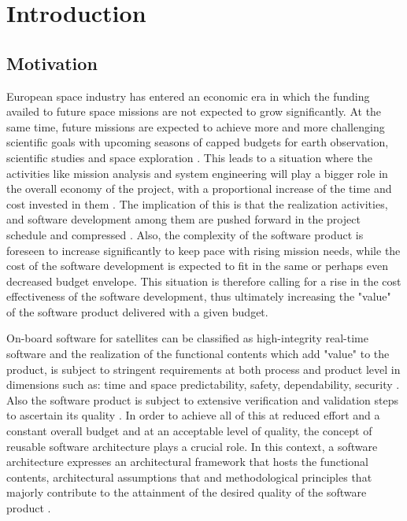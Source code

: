 
\chapter{Introduction}
\label{chap: Introduction}
\section{Motivation}
European space industry has entered an economic era in which the funding availed to future space missions are not expected to grow significantly. At the same time, future missions are expected to achieve more and more challenging scientific goals with upcoming seasons of capped budgets for earth observation, scientific studies and space exploration \cite{PhdThesis}. This leads to a situation where the activities like mission analysis and system engineering will play a bigger role in the overall economy of the project, with a proportional increase of the time and cost invested in them \cite{PhdThesis}. The implication of this is that the realization activities, and software development among them are pushed forward in the project schedule and compressed \cite{SAVOIR}. Also, the complexity of the software product is foreseen to increase significantly to keep pace with rising mission needs, while the cost of the software development is expected to fit in the same or perhaps even decreased budget envelope. This situation is therefore calling for a rise in the cost effectiveness of the software development, thus ultimately increasing the "value" of the software product delivered with a given budget.

On-board software for satellites can be classified as high-integrity real-time software and the realization of the functional contents which add "value" to the product, is subject to stringent requirements at both process and product level in dimensions such as: time and space predictability, safety, dependability, security \cite{PhdThesis}. Also the software product is subject to extensive verification and validation steps to ascertain its quality \cite{SAVOIR}. In order to achieve all of this at reduced effort and a constant overall budget and at an acceptable level of quality, the concept of reusable software architecture plays a crucial role. In this context, a software architecture expresses an architectural framework that hosts the functional contents, architectural assumptions that and methodological principles that majorly contribute to the attainment of the desired quality of the software product \cite{PhdThesis}.

